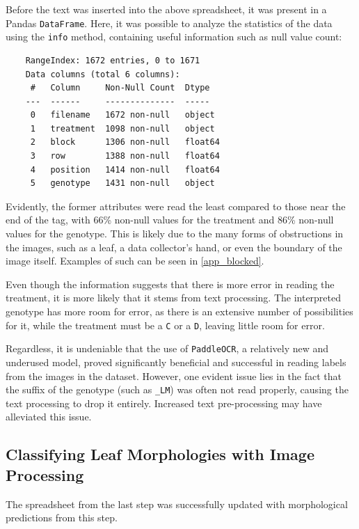 \documentclass[final,5p,times,twocolumn,authoryear]{elsarticle}
\begin{document}
Before the text was inserted into the above spreadsheet, it was present in a Pandas \verb|DataFrame|. Here, it was possible to analyze the statistics of the data using the \verb|info| method, containing useful information such as null value count:

\begin{verbatim}
    RangeIndex: 1672 entries, 0 to 1671
    Data columns (total 6 columns):
     #   Column     Non-Null Count  Dtype  
    ---  ------     --------------  -----  
     0   filename   1672 non-null   object 
     1   treatment  1098 non-null   object 
     2   block      1306 non-null   float64
     3   row        1388 non-null   float64
     4   position   1414 non-null   float64
     5   genotype   1431 non-null   object 
\end{verbatim}

Evidently, the former attributes were read the least compared to those near the end of the tag, with 66\% non-null values for the treatment and 86\% non-null values for the genotype. This is likely due to the many forms of obstructions in the images, such as a leaf, a data collector's hand, or even the boundary of the image itself. Examples of such can be seen in \ref{app_blocked}.

Even though the information suggests that there is more error in reading the treatment, it is more likely that it stems from text processing. The interpreted genotype has more room for error, as there is an extensive number of possibilities for it, while the treatment must be a \verb|C| or a \verb|D|, leaving little room for error.

Regardless, it is undeniable that the use of \verb|PaddleOCR|, a relatively new and underused model, proved significantly beneficial and successful in reading labels from the images in the dataset. However, one evident issue lies in the fact that the suffix of the genotype (such as \verb|_LM|) was often not read properly, causing the text processing to drop it entirely. Increased text pre-processing may have alleviated this issue.

\subsection{Classifying Leaf Morphologies with Image Processing}
\label{step_2}

The spreadsheet from the last step was successfully updated with morphological predictions from this step.
\end{document}

